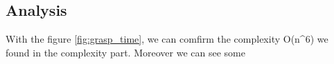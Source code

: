 
\subsection{Analysis}

With the figure \ref{fig:grasp_time}, we can comfirm the complexity O(n^6) we found in the complexity part.
Moreover we can see some 